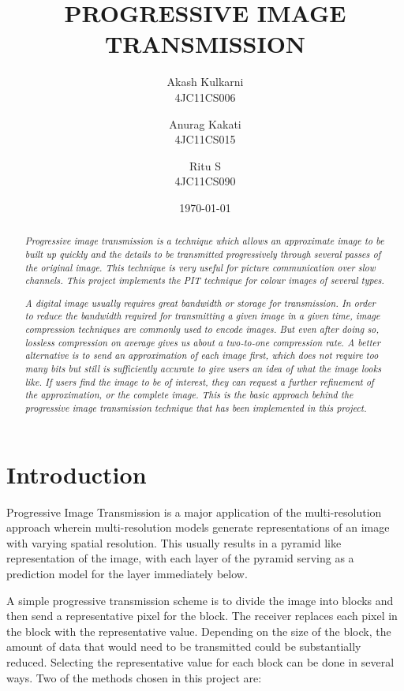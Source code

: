 \documentclass[twocolumn,12pt]{article}
\begin{document}
\title{\bf PROGRESSIVE IMAGE TRANSMISSION}
\author{Akash Kulkarni\\4JC11CS006\and Anurag Kakati\\4JC11CS015\and Ritu S\\4JC11CS090}
\date{\today}
\maketitle
\begin{abstract}
\vspace{-11mm}
\emph{Progressive image transmission is a technique which allows an approximate image to be built up quickly and the details to be transmitted progressively through several passes of the original image. This technique is very useful for picture communication over slow channels. This project implements the PIT technique for colour images of several types.}

\emph{A digital image usually requires great bandwidth or storage for transmission. In order to reduce the bandwidth required for transmitting a given image in a given time, image compression techniques are commonly used to encode images. But even after doing so, lossless compression on average gives us about a two-to-one compression rate.  A better alternative is to send an approximation of each image first, which does not require too many bits but still is sufficiently accurate to give users an idea of what the image looks like. If users find the image to be of interest, they can request a further refinement of the approximation, or the complete image. This is the basic approach behind the progressive image transmission technique that has been implemented in this project.}

\end{abstract}
\section{Introduction}
Progressive Image Transmission is a major application of the multi-resolution approach wherein multi-resolution models generate representations of an image with varying spatial resolution. This usually results in a pyramid like representation of the image, with each layer of the pyramid serving as a prediction model for the layer immediately below.

A simple progressive transmission scheme is to divide the image into blocks and then send a representative pixel for the block. The receiver replaces each pixel in the block with the representative value. Depending on the size of the block, the amount of data that would need to be transmitted could be substantially reduced.
Selecting the representative value for each block can be done in several ways. Two of the methods chosen in this project are:
\end{document}
